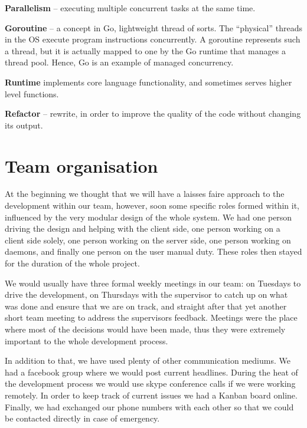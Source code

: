 \documentclass{l3proj}
\begin{document}
\begin{appendices}
\textbf{Parallelism} -- executing multiple concurrent tasks at the same time. 

\textbf{Goroutine} -- a concept in Go, lightweight thread of sorts. The ``physical'' threads in the OS execute program instructions concurrently. A goroutine represents such a thread, but it is actually mapped to one by the Go runtime that manages a thread pool. Hence, Go is an example of managed concurrency.

\textbf{Runtime} implements core language functionality, and sometimes serves higher level functions.

\textbf{Refactor} -- rewrite, in order to improve the quality of the code without changing its output.



\chapter{Team organisation}

At the beginning we thought that we will have a laisses faire approach to the development within our team, however, soon some specific roles formed within it, influenced by the very modular design of the whole system. We had one person driving the design and helping with the client side, one person working on a client side solely, one person working on the server side, one person working on daemons, and finally one person on the user manual duty. These roles then stayed for the duration of the whole project.

We would usually have three formal weekly meetings in our team: on Tuesdays to drive the development, on Thursdays with the supervisor to catch up on what was done and ensure that we are on track, and straight after that yet another short team meeting to address the supervisors feedback. Meetings were the place where most of the decisions would have been made, thus they were extremely important to the whole development process.

In addition to that, we have used plenty of other communication mediums. We had a facebook group where we would post current headlines. During the heat of the development process we would use skype conference calls if we were working remotely. In order to keep track of current issues we had a Kanban board online. Finally, we had exchanged our phone numbers with each other so that we could be contacted directly in case of emergency.


\end{appendices}
\end{document}

